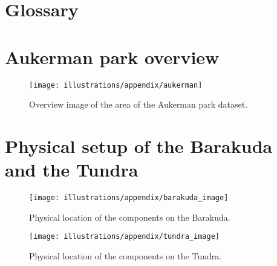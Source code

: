 \chapter{Glossary}\label{ch:glossary}

\begingroup
\renewcommand{\clearpage}{\relax}
\printglossary[type=\acronymtype]
\printglossary
\endgroup

\printbibliography[heading=bibnumbered, title={Bibliography}]

\appendix


\chapter{Aukerman park overview}\label{ch:aukerman-park-overview}

\begin{figure}[!ht]
    \centering
    \texttt{[image: illustrations/appendix/aukerman]}
    \caption{Overview image of the area of the Aukerman park dataset.}
    \label{fig:appendix:aukerman_overview}
\end{figure}


\chapter{Physical setup of the Barakuda and the Tundra}%
\vspace*{-2cm}%
\begin{figure}[!ht]%
    \centering%
    \texttt{[image: illustrations/appendix/barakuda\_image]}%
    \caption{Physical location of the components on the Barakuda.}%
    \label{fig:appendix:barakuda_image}%
\end{figure}%
\begin{figure}[!ht]%
    \centering%
    \texttt{[image: illustrations/appendix/tundra\_image]}%
    \caption{Physical location of the components on the Tundra.}%
    \label{fig:appendix:tundra_image}%
\end{figure}%
